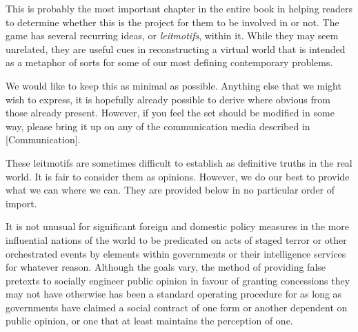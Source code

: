 

This is probably the most important chapter in the entire book in helping readers to determine whether this is the project for them to be involved in or not. The game has several recurring ideas, or {\it leitmotifs}, within it. While they may seem unrelated, they are useful cues in reconstructing a virtual world that is intended as a metaphor of sorts for some of our most defining contemporary problems.

We would like to keep this  as minimal as possible. Anything else that we might wish to express, it is hopefully already possible to derive where obvious from those already present. However, if you feel the set should be modified in some way, please bring it up on any of the communication media described in [Communication]. 

These leitmotifs are sometimes difficult to establish as definitive truths in the real world. It is fair to consider them as opinions. However, we do our best to provide what we can where we can. They are provided below in no particular order of import.

\startitemize[4]

It is not unusual for significant foreign and domestic policy measures in the more influential nations of the world to be predicated on acts of staged terror or other orchestrated events by elements within governments or their intelligence services for whatever reason. Although the goals vary, the method of providing false pretexts to socially engineer public opinion in favour of granting concessions they may not have otherwise has been a standard operating procedure for as long as governments have claimed a social contract of one form or another dependent on public opinion, or one that at least maintains the perception of one.


